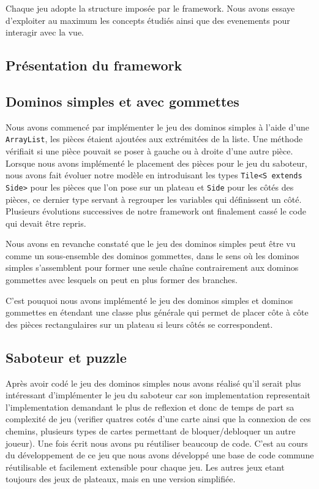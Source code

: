 \documentclass[a4paper, 11pt, DIV=9]{scrartcl}
\begin{document}
Chaque jeu adopte la structure imposée par le framework.
Nous avons essaye d'exploiter au maximum les concepts étudiés ainsi que des evenements
pour interagir avec la vue.


\subsection{Présentation du framework}


\subsection{Dominos simples et avec gommettes}
Nous avons commencé par implémenter le jeu des dominos simples à l'aide d'une
\texttt{ArrayList}, les pièces étaient ajoutées aux extrémitées de la liste. Une
méthode vérifiait si une pièce pouvait se poser à gauche ou à droite d'une autre
pièce. Lorsque nous avons implémenté le placement des pièces pour le jeu du
saboteur, nous avons fait évoluer notre modèle en introduisant les types \texttt{Tile<S
extends Side>} pour les pièces que l'on pose sur un plateau et \texttt{Side}
pour les côtés des pièces, ce dernier type servant à regrouper les variables qui
définissent un côté. Plusieurs évolutions successives de notre framework ont
finalement cassé le code qui devait être repris.

Nous avons en revanche constaté que le jeu des dominos simples peut être vu
comme un sous-ensemble des dominos gommettes, dans le sens où les dominos
simples s'assemblent pour former une seule chaîne contrairement aux dominos
gommettes avec lesquels on peut en plus former des branches.

C'est pouquoi nous avons implémenté le jeu des dominos simples et dominos
gommettes en étendant une classe plus générale qui permet de placer côte à côte
des pièces rectangulaires sur un plateau si leurs côtés se correspondent.

%

\subsection{Saboteur et puzzle}

Après avoir codé le jeu des dominos simples nous avons réalisé qu'il serait plus
intéressant d'implémenter le jeu du saboteur car son implementation representait l'implementation demandant le plus 
de reflexion et donc de temps de part sa complexité de jeu (verifier quatres cotés d'une carte ainsi que la connexion 
de ces chemins, plusieurs types de cartes permettant de bloquer/debloquer un autre joueur).
Une fois écrit nous avons pu 
réutiliser beaucoup de code. 
C'est au cours du développement de ce jeu que nous
avons développé une base de code commune réutilisable et facilement extensible
pour chaque jeu. Les autres jeux etant toujours des jeux de plateaux, mais en  une version
simplifiée.
\end{document}

